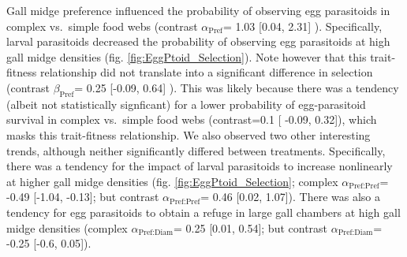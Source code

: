\documentclass[11pt,]{article}
\begin{document}
Gall midge preference influenced the probability of observing egg
parasitoids in complex vs.~simple food webs (contrast
\(\alpha_{\text{Pref}}\)= 1.03 {[}0.04, 2.31{]} ). Specifically, larval
parasitoids decreased the probability of observing egg parasitoids at
high gall midge densities (fig. \ref{fig:EggPtoid_Selection}). Note
however that this trait-fitness relationship did not translate into a
significant difference in selection (contrast \(\beta_{\text{Pref}}\)=
0.25 {[}-0.09, 0.64{]} ). This was likely because there was a tendency
(albeit not statistically signficant) for a lower probability of
egg-parasitoid survival in complex vs.~simple food webs (contrast=0.1
{[} -0.09, 0.32{]}), which masks this trait-fitness relationship. We
also observed two other interesting trends, although neither
significantly differed between treatments. Specifically, there was a
tendency for the impact of larval parasitoids to increase nonlinearly at
higher gall midge densities (fig. \ref{fig:EggPtoid_Selection}; complex
\(\alpha_{\text{Pref:Pref}}\)= -0.49 {[}-1.04, -0.13{]}; but contrast
\(\alpha_{\text{Pref:Pref}}\)= 0.46 {[}0.02, 1.07{]}). There was also a
tendency for egg parasitoids to obtain a refuge in large gall chambers
at high gall midge densities (complex \(\alpha_{\text{Pref:Diam}}\)=
0.25 {[}0.01, 0.54{]}; but contrast \(\alpha_{\text{Pref:Diam}}\)= -0.25
{[}-0.6, 0.05{]}).
\end{document}
